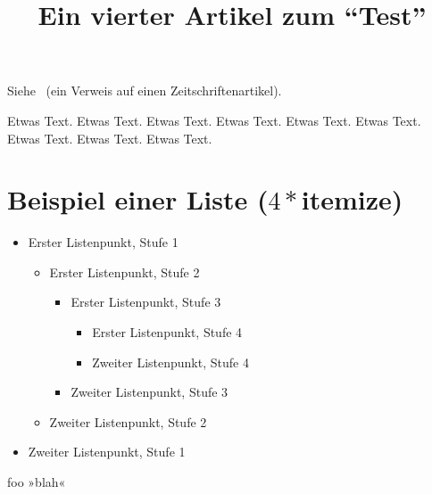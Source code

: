 \documentclass{dtk}
\begin{document}
\title{Ein vierter Artikel zum "`Test"'}

\maketitle

Siehe~\cite{Niepraschk-dtk15.1:niepraschk.voss:texlivelist} (ein Verweis auf
einen Zeitschriftenartikel).

Etwas Text. Etwas Text. Etwas Text. Etwas Text. Etwas Text. Etwas Text.
Etwas Text. Etwas Text. Etwas Text.

\section{Beispiel einer Liste ($4*$itemize)}

\begin{itemize}
  \item Erster Listenpunkt, Stufe 1
  \begin{itemize}
    \item Erster Listenpunkt, Stufe 2
    \begin{itemize}
      \item Erster Listenpunkt, Stufe 3
      \begin{itemize}
        \item Erster Listenpunkt, Stufe 4
        \item Zweiter Listenpunkt, Stufe 4
      \end{itemize}
      \item Zweiter Listenpunkt, Stufe 3
    \end{itemize}
    \item Zweiter Listenpunkt, Stufe 2
  \end{itemize}
  \item Zweiter Listenpunkt, Stufe 1
\end{itemize}

foo »blah«


\printbibliography
\end{document}
